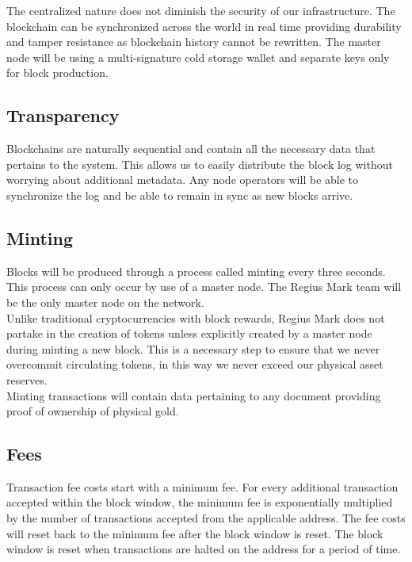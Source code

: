 \documentclass[12pt,a4paper]{article}
\begin{document}
  \newpage
  The centralized nature does not diminish the security of our infrastructure.
  The blockchain can be synchronized across the world in real time providing
  durability and tamper resistance as blockchain history cannot be rewritten.
  The master node will be using a multi-signature cold storage wallet and
  separate keys only for block production.

  \subsection{Transparency}
  Blockchains are naturally sequential and contain all the necessary data that
  pertains to the system. This allows us to easily distribute the block log
  without worrying about additional metadata. Any node operators will be able to
  synchronize the log and be able to remain in sync as new blocks arrive.

  \subsection{Minting}
  Blocks will be produced through a process called minting every three seconds.
  This process can only occur by use of a master node. The Regius Mark team will
  be the only master node on the network.\\

  Unlike traditional cryptocurrencies with block rewards, Regius Mark does not
  partake in the creation of tokens unless explicitly created by a master node
  during minting a new block. This is a necessary step to ensure that we never
  overcommit circulating tokens, in this way we never exceed our physical asset
  reserves.\\

  Minting transactions will contain data pertaining to any document providing
  proof of ownership of physical gold.

  \subsection{Fees}
  Transaction fee costs start with a minimum fee. For every additional
  transaction accepted within the block window, the minimum fee is exponentially
  multiplied by the number of transactions accepted from the applicable address.
  The fee costs will reset back to the minimum fee after the block window is
  reset. The block window is reset when transactions are halted on the address
  for a period of time.\\
\end{document}
